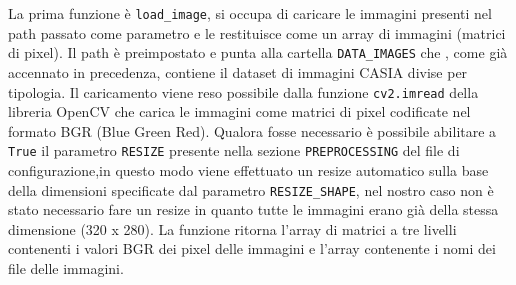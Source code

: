 La prima funzione è \texttt{load\_image}, si occupa di caricare le immagini presenti nel path passato come parametro e le restituisce come un array di immagini (matrici di pixel). Il path è preimpostato e punta alla cartella \texttt{DATA\_IMAGES} che , come già accennato in precedenza, contiene il dataset di immagini CASIA divise per tipologia. Il caricamento viene reso possibile dalla funzione \texttt{cv2.imread} della libreria OpenCV che carica le immagini come matrici di pixel codificate nel formato BGR (Blue Green Red). Qualora fosse necessario è possibile abilitare a \texttt{True} il parametro \texttt{RESIZE} presente nella sezione \texttt{PREPROCESSING} del file di configurazione,in questo modo viene effettuato un resize automatico sulla base della dimensioni specificate dal parametro \texttt{RESIZE\_SHAPE}, nel nostro caso non è stato necessario fare un resize in quanto tutte le immagini erano già della stessa dimensione (320 x  280). La funzione ritorna l’array di matrici a tre livelli contenenti i valori BGR dei pixel delle immagini e l’array contenente i nomi dei file delle immagini.
